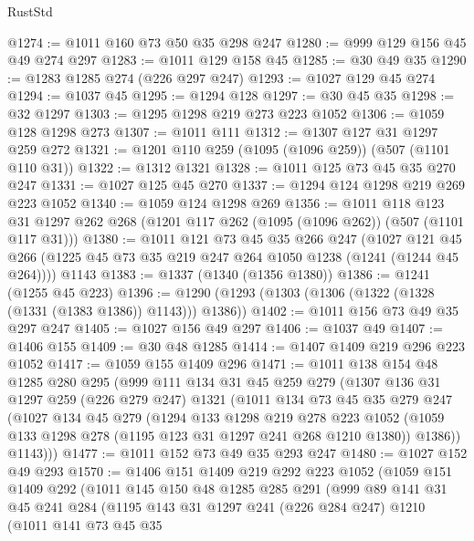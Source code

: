 \begin{lexlean}{RustStd}
\begin{coremodule}
@1274 := @1011 @160 @73 @50 @35 @298 @247
@1280 := @999 @129 @156 @45 @49 @274 @297
@1283 := @1011 @129 @158 @45
@1285 := @30 @49 @35
@1290 := @1283 @1285 @274 (@226 @297 @247)
@1293 := @1027 @129 @45 @274
@1294 := @1037 @45
@1295 := @1294 @128
@1297 := @30 @45 @35
@1298 := @32 @1297
@1303 := @1295 @1298 @219 @273 @223 @1052
@1306 := @1059 @128 @1298 @273
@1307 := @1011 @111
@1312 := @1307 @127 @31 @1297 @259 @272
@1321 := @1201 @110 @259 (@1095 (@1096 @259)) (@507 (@1101 @110 @31))
@1322 := @1312 @1321
@1328 := @1011 @125 @73 @45 @35 @270 @247
@1331 := @1027 @125 @45 @270
@1337 := @1294 @124 @1298 @219 @269 @223 @1052
@1340 := @1059 @124 @1298 @269
@1356 := @1011
    @118
    @123
    @31
    @1297
    @262
    @268
    (@1201 @117 @262 (@1095 (@1096 @262)) (@507 (@1101 @117 @31)))
@1380 := @1011
    @121
    @73
    @45
    @35
    @266
    @247
    (@1027 @121 @45 @266 (@1225 @45 @73 @35 @219 @247 @264 @1050 @1238 (@1241 (@1244 @45 @264))))
    @1143
@1383 := @1337 (@1340 (@1356 @1380))
@1386 := @1241 (@1255 @45 @223)
@1396 := @1290 (@1293 (@1303 (@1306 (@1322 (@1328 (@1331 (@1383 @1386)) @1143))) @1386))
@1402 := @1011 @156 @73 @49 @35 @297 @247
@1405 := @1027 @156 @49 @297
@1406 := @1037 @49
@1407 := @1406 @155
@1409 := @30 @48 @1285
@1414 := @1407 @1409 @219 @296 @223 @1052
@1417 := @1059 @155 @1409 @296
@1471 := @1011
    @138
    @154
    @48
    @1285
    @280
    @295
    (@999
      @111
      @134
      @31
      @45
      @259
      @279
      (@1307
        @136
        @31
        @1297
        @259
        (@226 @279 @247)
        @1321
        (@1011
          @134
          @73
          @45
          @35
          @279
          @247
          (@1027
            @134
            @45
            @279
            (@1294
              @133
              @1298
              @219
              @278
              @223
              @1052
              (@1059 @133 @1298 @278 (@1195 @123 @31 @1297 @241 @268 @1210 @1380))
              @1386))
          @1143)))
@1477 := @1011 @152 @73 @49 @35 @293 @247
@1480 := @1027 @152 @49 @293
@1570 := @1406
    @151
    @1409
    @219
    @292
    @223
    @1052
    (@1059
      @151
      @1409
      @292
      (@1011
        @145
        @150
        @48
        @1285
        @285
        @291
        (@999
          @89
          @141
          @31
          @45
          @241
          @284
          (@1195
            @143
            @31
            @1297
            @241
            (@226 @284 @247)
            @1210
            (@1011
              @141
              @73
              @45
              @35

\end{coremodule}
\end{lexlean}
